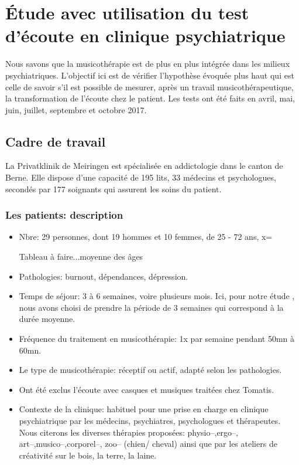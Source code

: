 \chapter[\'Etude en clinique]{\'Etude avec utilisation du test
  d'écoute en clinique psychiatrique}

Nous savons que la musicothérapie est de plus en plus intégrée dans
les milieux psychiatriques.
L'objectif ici est de vérifier l'hypothèse évoquée plus haut qui est celle de
savoir s'il est possible de mesurer, après un travail 
musicothérapeutique, la transformation de l'écoute chez le
patient.
Les tests ont été faits en avril, mai, juin, juillet, septembre et octobre 2017.

\section{Cadre de travail}

 La Privatklinik
de Meiringen est  spécialisée en
addictologie dans le canton de Berne. Elle dispose d'une capacité de 195 lits, 33 médecins et
psychologues, secondés par 177 soignants qui assurent les soins du
patient.




\subsection{Les patients: description}


 \begin{itemize}
 
 \item Nbre: 29 personnes, dont 19 hommes et 10 femmes, de 25 - 72
   ans, x=

   Tableau à faire...moyenne des âges 
 

 \item Pathologies:  burnout, dépendances, dépression.

 \item Temps de séjour: 3 à 6 semaines, voire plusieurs mois. Ici, pour
notre étude , nous avons choisi de prendre la période de 3 semaines
qui correspond à la durée moyenne.
 \item Fréquence du traitement en musicothérapie: 1x par semaine pendant
50mn à 60mn.
 \item Le type de musicothérapie: réceptif ou actif, adapté selon les pathologies.
 \item Ont été  exclus l'écoute avec casques et  musiques traitées
   chez Tomatis.
 \item Contexte de la clinique: habituel pour une prise en
charge en clinique psychiatrique 
par les médecins, psychiatres, psychologues et thérapeutes.
Nous citerons les diverses thérapies proposées: physio--,ergo--,
art--,musico--,corporel--, zoo--  (chien/ cheval)  ainsi
que par les  ateliers de créativité sur le bois, la terre, la laine.  

\end{itemize}
